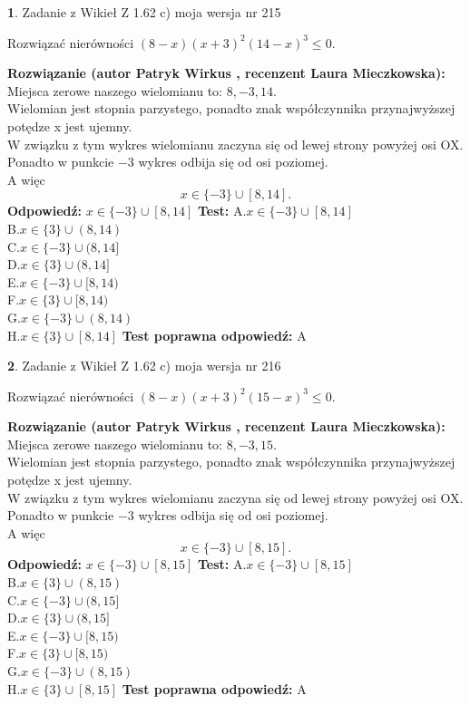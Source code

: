 \documentclass[12pt, a4paper]{article}
\theoremstyle{definition} %
\newtheorem{zad}{}
\newcommand{\zadStart}[1]{\begin{zad}#1\newline}
\newcommand{\zadStop}{\end{zad}}
\newcommand{\rozwStart}[2]{\noindent \textbf{Rozwiązanie (autor #1 , recenzent #2): }\newline}
\newcommand{\rozwStop}{\newline}
\newcommand{\odpStart}{\noindent \textbf{Odpowiedź:}\newline}
\newcommand{\odpStop}{\newline}
\newcommand{\testStart}{\noindent \textbf{Test:}\newline}
\newcommand{\testStop}{\newline}
\newcommand{\kluczStart}{\noindent \textbf{Test poprawna odpowiedź:}\newline}
\newcommand{\kluczStop}{\newline}
\begin{document}
\zadStart{Zadanie z Wikieł Z 1.62 c) moja wersja nr 215}

Rozwiązać nierówności $(8-x)(x+3)^{2}(14-x)^{3}\le0$.
\zadStop
\rozwStart{Patryk Wirkus}{Laura Mieczkowska}
Miejsca zerowe naszego wielomianu to: $8, -3, 14$.\\
Wielomian jest stopnia parzystego, ponadto znak współczynnika przy\linebreak najwyższej potędze x jest ujemny.\\ W związku z tym wykres wielomianu zaczyna się od lewej strony powyżej osi OX.\\
Ponadto w punkcie $-3$ wykres odbija się od osi poziomej.\\
A więc $$x \in \{-3\} \cup [8,14].$$
\rozwStop
\odpStart
$x \in \{-3\} \cup [8,14]$
\odpStop
\testStart
A.$x \in \{-3\} \cup [8,14]$\\
B.$x \in \{3\} \cup (8,14)$\\
C.$x \in \{-3\} \cup (8,14]$\\
D.$x \in \{3\} \cup (8,14]$\\
E.$x \in \{-3\} \cup [8,14)$\\
F.$x \in \{3\} \cup [8,14)$\\
G.$x \in \{-3\} \cup (8,14)$\\
H.$x \in \{3\} \cup [8,14]$
\testStop
\kluczStart
A
\kluczStop



\zadStart{Zadanie z Wikieł Z 1.62 c) moja wersja nr 216}

Rozwiązać nierówności $(8-x)(x+3)^{2}(15-x)^{3}\le0$.
\zadStop
\rozwStart{Patryk Wirkus}{Laura Mieczkowska}
Miejsca zerowe naszego wielomianu to: $8, -3, 15$.\\
Wielomian jest stopnia parzystego, ponadto znak współczynnika przy\linebreak najwyższej potędze x jest ujemny.\\ W związku z tym wykres wielomianu zaczyna się od lewej strony powyżej osi OX.\\
Ponadto w punkcie $-3$ wykres odbija się od osi poziomej.\\
A więc $$x \in \{-3\} \cup [8,15].$$
\rozwStop
\odpStart
$x \in \{-3\} \cup [8,15]$
\odpStop
\testStart
A.$x \in \{-3\} \cup [8,15]$\\
B.$x \in \{3\} \cup (8,15)$\\
C.$x \in \{-3\} \cup (8,15]$\\
D.$x \in \{3\} \cup (8,15]$\\
E.$x \in \{-3\} \cup [8,15)$\\
F.$x \in \{3\} \cup [8,15)$\\
G.$x \in \{-3\} \cup (8,15)$\\
H.$x \in \{3\} \cup [8,15]$
\testStop
\kluczStart
A
\kluczStop
\end{document}
